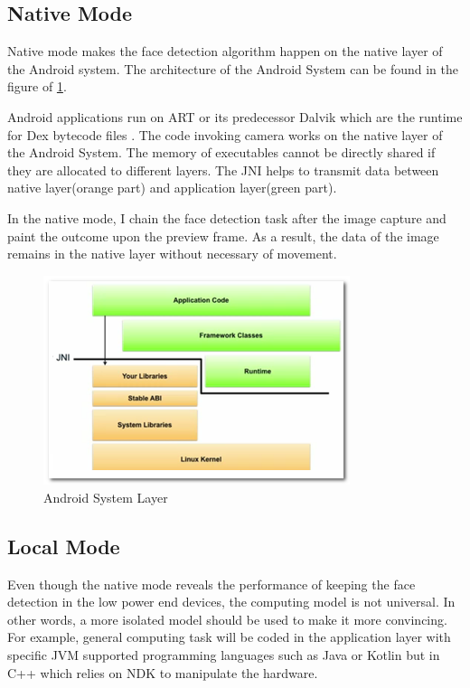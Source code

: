 \subsection{Native Mode}
Native mode makes the face detection algorithm happen on the native layer of the Android system. The architecture of the Android System can be found in the figure of \ref{fig:android_application_layer}.

Android applications run on ART or its predecessor Dalvik which are the runtime for Dex bytecode files \cite{android-art}. The code invoking camera works on the native layer of the Android System. The memory of executables cannot be directly shared if they are allocated to different layers. The JNI helps to transmit data between native layer(orange part) and application layer(green part).

In the native mode, I chain the face detection task after the image capture and paint the outcome upon the preview frame. As a result, the data of the image remains in the native layer without necessary of movement.


\begin{figure}
    \centering
    \includegraphics[width=0.8\textwidth]{images/jni.jpg}
    \caption{Android System Layer}
    \label{fig:android_application_layer}
\end{figure}

\subsection{Local Mode}
Even though the native mode reveals the performance of keeping the face detection in the low power end devices, the computing model is not universal. In other words, a more isolated model should be used to make it more convincing. For example, general computing task will be coded in the application layer with specific JVM supported programming languages such as Java or Kotlin but in C++ which relies on NDK to manipulate the hardware. 

